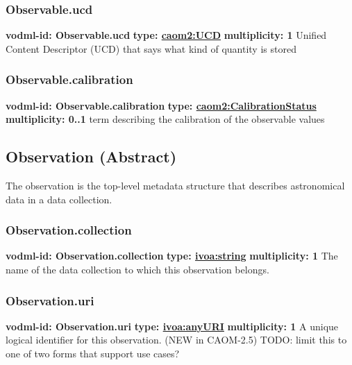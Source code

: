     \subsubsection{Observable.ucd}
      \textbf{vodml-id: Observable.ucd} \newline
      \textbf{type: \hyperref[sect:UCD]{caom2:UCD}} \newline
      \textbf{multiplicity: 1} \newline
      Unified Content Descriptor (UCD) that says what kind of quantity is stored

    \subsubsection{Observable.calibration}
      \textbf{vodml-id: Observable.calibration} \newline
      \textbf{type: \hyperref[sect:CalibrationStatus]{caom2:CalibrationStatus}} \newline
      \textbf{multiplicity: 0..1} \newline
      term describing the calibration of the observable values

  \subsection{Observation (Abstract)}
  \label{sect:Observation}
    The observation is the top-level metadata structure that describes astronomical data in a data collection.

    \subsubsection{Observation.collection}
      \textbf{vodml-id: Observation.collection} \newline
      \textbf{type: \hyperref[sect:ivoa]{ivoa:string}} \newline
      \textbf{multiplicity: 1} \newline
      The name of the data collection to which this observation belongs.

    \subsubsection{Observation.uri}
      \textbf{vodml-id: Observation.uri} \newline
      \textbf{type: \hyperref[sect:ivoa]{ivoa:anyURI}} \newline
      \textbf{multiplicity: 1} \newline
      A unique logical identifier for this observation. (NEW in CAOM-2.5) TODO: limit this to one of two forms that support use cases?

